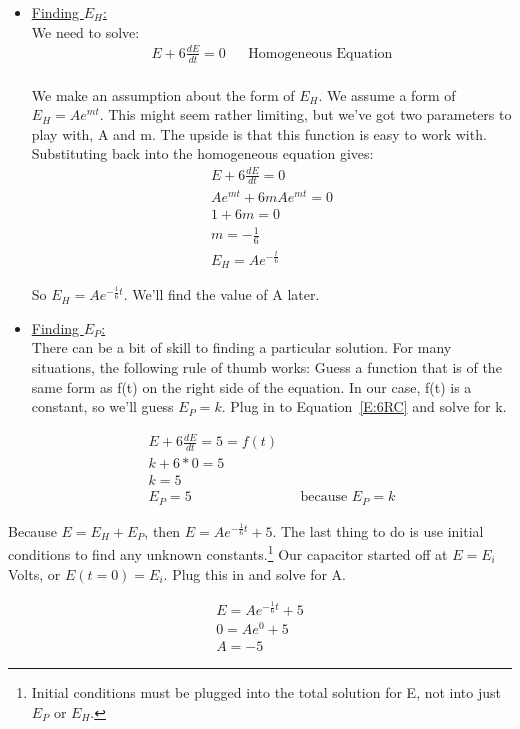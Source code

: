\begin{itemize}
\item \underline{Finding $E_H$:}\\
We need to solve:
\begin{align*}
E+6\frac{dE}{dt}=0 &&\text{Homogeneous Equation}\\
\end{align*}

We make an assumption about the form of $E_H$. We assume a form of $E_H=Ae^{mt}$. This might seem rather limiting, but we've got two parameters to play with, A and m. The upside is that this function is easy to work with. Substituting back into the homogeneous equation gives:\\

\begin{align*}
E+6\frac{dE}{dt}=0 \\
Ae^{mt} + 6mAe^{mt} =0\\
1+6m=0\\
m = -\frac{1}{6}\\
E_H=Ae^{-\frac{t}{6}}
\end{align*}

So $E_H = Ae^{-\frac{1}{6}t}$.  We'll find the value of A later.
 
\item \underline{Finding $E_P$:}\\
There can be a bit of skill to finding a particular solution. For many situations, the following rule of thumb works: Guess a function that is of the same form as f(t) on the right side of the equation. In our case, f(t) is a constant, so we'll guess $E_P=k$. Plug in to Equation~\eqref{E:6RC} and solve for k.

\begin{align*}
E+6\frac{dE}{dt}=5=f(t) \\
k + 6*0 =5\\
k=5\\
E_P=5 &&\text{because $E_P=k$}
\end{align*}

\end{itemize}

Because $E=E_H+E_P$, then $E=Ae^{-\frac{1}{6}t}+5$. The last thing to do is use initial conditions to find any unknown constants.\footnote{Initial conditions must be plugged into the total solution for E, not into just $E_P$ or $E_H$.} Our capacitor started off at $E=E_i$ Volts, or $E(t=0)=E_i$. Plug this in and solve for A.

\begin{align*}
E=Ae^{-\frac{1}{6}t}+5 \\
0=Ae^{0}+5\\
A=-5
\end{align*}

